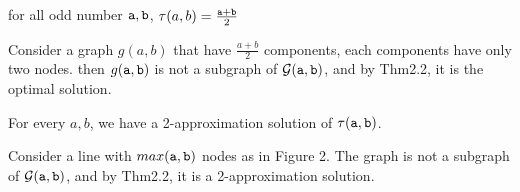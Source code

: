 \begin{corollary}
for all odd number $\mathtt{a},\mathtt{b}$, $\tau(a,b)=\frac{\mathtt{a}+\mathtt{b}}{2}$
\end{corollary}

Consider a graph  $g(a,b)$ that have  $\frac{a+b}{2}$ components, each components have only two nodes. then  $g(\mathtt{a},\mathtt{b})$ is not a subgraph of  ${\cal G}(\mathtt{a},\mathtt{b})$, and by Thm2.2, it is the optimal solution.

\begin{theorem} 
For every $a,b$, we have a 2-approximation solution of  $\tau(\mathtt{a},\mathtt{b})$.
\end{theorem}
Consider a line with $max(\mathtt{a},\mathtt{b})$ nodes as in Figure 2. The graph is not a subgraph of  ${\cal G}(\mathtt{a},\mathtt{b})$, and by Thm2.2, it is a 2-approximation solution.
